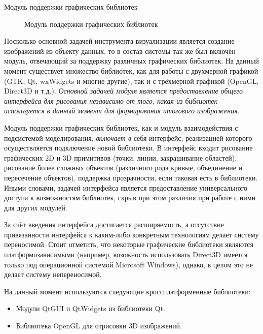 \documentclass[a4paper,12pt]{extarticle}
\begin{document}
\begin{subsection}{Модуль поддержки графических библиотек}
    \label{sec:architecture-graphics}
    \begin{figure}[h]
        \caption{Модуль поддержки графических библиотек}
        \label{ris:architecture-graphics}
    \end{figure}
    
    Посколько основной задачей инструмента визуализации является создание изображений из объекту данных, то в состав системы так же был включён модуль, отвечающий за поддержку различных графических библиотек. На данный момент существует множество библиотек, как для работы с двухмерной графикой (GTK, Qt, wxWidgets и многие другие), так и с трёхмерной графикой (OpenGL, Direct3D и т.д.). \textit{Основной задачей модуля является предоставление общего интерфейса для рисования независимо от того, какая из библиотек используется в данный момент для формирования итогового изображения}.

    Модуль поддержки графических библиотек, как и модуль взаимодействия с подсистемой моделирования, \textit{включает в} себя интерфейс, реализацией которого осуществляется подключение новой библиотеки. В интерфейс входит рисование графических 2D и 3D примитивов (точки, линии, закрашивание областей), рисование более сложных объектов (различного рода кривые, объединение и пересечение объектов), поддержка прозрачности, если таковая есть в библиотеки. Иными словами, задачей интерфейса является предоставление универсального доступа к возможностям библиотек, скрыв при этом различия при работе с ними для других модулей.

    За счёт введения интерфейса достигается расширяемость, а отсутствие привязанности интерфейса к каким-либо конкретным технологиям делает систему переносимой. Стоит отметить, что некоторые графические библиотеки являются платформозависимыми (например, возожность использовать Direct3D имеется только под операционной системой Microsoft Windows), однако, в целом это не делает систему непереносимой.

    На данный момент используются следующие кроссплатформенные библиотеки:
    \begin{itemize}
        \item Модули QtGUI и QtWidgets из библиотеки Qt.
        \item Библиотека OpenGL для отрисовки 3D изображений.
    \end{itemize}
\end{subsection}
\end{document}
